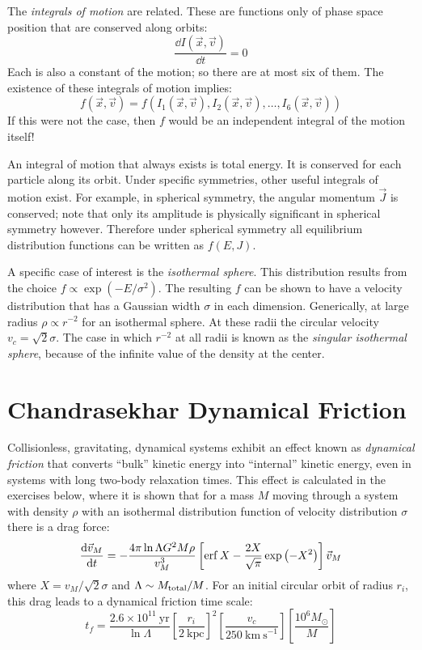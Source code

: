 The {\it integrals of motion} are related. These are functions only of
phase space position that are conserved along orbits:
\begin{equation}
\frac{\dd{I(\vec{x}, \vec{v})}}{\dd{t}} = 0 
\end{equation}
Each is also a constant of the motion; so there are at most six of
them. The existence of these integrals of motion implies:
\begin{equation}
f(\vec{x}, \vec{v}) = f\left(I_1(\vec{x}, \vec{v}),
I_2(\vec{x}, \vec{v}), \ldots, I_6(\vec{x}, \vec{v})\right)
\end{equation}
If this were not the case, then $f$ would be an independent integral
of the motion itself!

An integral of motion that always exists is total energy. It is
conserved for each particle along its orbit. Under specific
symmetries, other useful integrals of motion exist. For example, in
spherical symmetry, the angular momentum $\vec{J}$ is conserved; note
that only its amplitude is physically significant in spherical
symmetry however. Therefore under spherical symmetry all equilibrium
distribution functions can be written as $f(E, J)$. 

A specific case of interest is the {\it isothermal sphere}. This
distribution results from the choice $f\propto \exp(-E/\sigma^2)$. The
resulting $f$ can be shown to have a velocity distribution that has a
Gaussian width $\sigma$ in each dimension. Generically, at large
radius $\rho \propto r^{-2}$ for an isothermal sphere. At these radii
the circular velocity $v_c = \sqrt{2}\sigma$. The case in which
$r^{-2}$ at all radii is known as the {\it singular isothermal
sphere}, because of the infinite value of the density at the center.

\section{Chandrasekhar Dynamical Friction}

Collisionless, gravitating, dynamical systems exhibit an effect known
as {\it dynamical friction} that converts ``bulk'' kinetic energy into
``internal'' kinetic energy, even in systems with long two-body
relaxation times. This effect is calculated in the exercises below,
where it is shown that for a mass $M$ moving through a system with
density $\rho$ with an isothermal distribution function of velocity
distribution $\sigma$ there is a drag force:
\begin{equation}
\label{eq:chandra}
\frac{{\rm d}\vec{v}_M}{{\rm d}t} = - \frac{4\pi \ln\Lambda
G^2M\rho}{v_M^3} \left[\operatorname{erf} X
-  \frac{2X}{\sqrt{\pi}} \exp\left(-X^2\right) \right] \vec{v}_M
\end{equation}
where $X = v_M /\sqrt{2} \sigma$ and $\Lambda \sim M_{\rm total} / M$.
For an initial circular orbit of radius $r_i$, this drag leads to a
dynamical friction time scale:
\begin{equation}
\label{eq:dynamicalfraction}
t_{f} = \frac{2.6 \times
10^{11} \mathrm{~yr}}{\ln \Lambda} \left[\frac{r_i}{2\mathrm{~kpc}}\right]^2
\left[\frac{v_c}{250\mathrm{~km~s}^{-1}} \right]
\left[\frac{10^6 M_\odot}{M}\right]
\end{equation}

